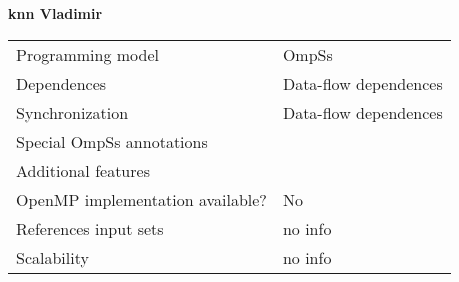 \section*{}
\label{knn_vladimir}
\centering
\Huge
\textbf{knn Vladimir}

\begin{table}[h!]
  \large
  \centering
  \begin{tabular}{|l|l|}
    \hline
    Programming model                & OmpSs \\
    Dependences                      & Data-flow dependences \\
    Synchronization                  & Data-flow dependences \\
    Special OmpSs annotations        &  \\
    Additional features              &  \\
    OpenMP implementation available? & No \\
    References input sets            & no info \\
    Scalability                      & no info \\
    \hline
  \end{tabular}
\end{table}

\newpage

